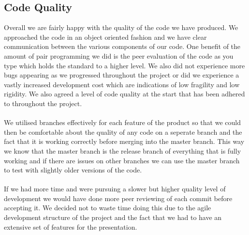 \documentclass{article}
\begin{document}
\subsection{Code Quality}
Overall we are fairly happy with the quality of the code we have produced. We approached the code in an object oriented fashion and we have clear communication between the various components of our code. One benefit of the amount of pair programming we did is the peer evaluation of the code as you type which holds the standard to a higher level. We also did not experience more bugs appearing as we progressed throughout the project or did we experience a vastly increased development cost which are indications of low fragility and low rigidity. We also agreed a level of code quality at the start that has been adhered to throughout the project.
\\\\
We utilised branches effectively for each feature of the product so that we could then be comfortable about the quality of any code on a seperate branch and the fact that it is working correctly before merging into the master branch. This way we know that the master branch is the release branch of everything that is fully working and if there are issues on other branches we can use the master branch to test with slightly older versions of the code.
\\\\
If we had more time and were pursuing a slower but higher quality level of development we would have done more peer reviewing of each commit before accepting it. We decided not to waste time doing this due to the agile development structure of the project and the fact that we had to have an extensive set of features for the presentation.
\end{document}
